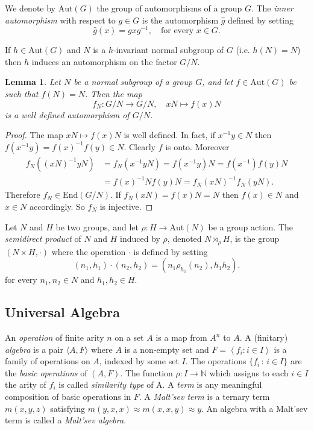 \documentclass[a4paper, english, 9pt]{amsart}
\theoremstyle{plain}
\newtheorem{lemma}[theorem]{Lemma}
\theoremstyle{definition}
\def\aut#1{\mathrm{Aut}(#1)}
\def\End#1{\mathrm{End}(#1)}
\def\comment#1{{\color{red} #1}}
\def\setof#1#2{\{#1\,\colon\,#2\}}
\def\fs#1{{\color{cyan} #1}}
\begin{document}
We denote by $\aut{G}$ the group of automorphisms of a group $G$. The \emph{inner automorphism} with respect to $g\in G$ is the automorphism $\widehat{g}$ defined by setting 
\[
\widehat{g}(x) = gxg^{-1}, \quad \text{for every } x \in G.
\]
 
 If $h\in \aut{G}$ and $N$ is a $h$-invariant normal subgroup of $G$ (i.e. $h(N)=N$) then $h$ induces an automorphism on the factor $G/N$.%

\begin{lemma}
    Let $N$ be a normal subgroup of a group $G$, and let $f\in\aut{G}$ be such that $f(N)=N$. Then the map $$f_N:G/N\longrightarrow G/N,\quad xN \mapsto f(x)N$$ is a well defined automorphism of $G/N$.
\end{lemma}
\begin{proof}
    The map $xN\mapsto f(x)N$ is well defined. In fact, if $x^{-1}y\in N$ then $f(x^{-1}y)=f(x)^{-1}f(y)\in N$. Clearly $f$ is onto. Moreover 
    \begin{align*}
    f_N((xN)^{-1} yN)&=f_N(x^{-1}yN)=f(x^{-1}y)N=f(x^{-1})f(y)N\\&=f(x)^{-1}N f(y)N=f_N(xN)^{-1}f_N(yN).        
    \end{align*}
 Therefore $f_N\in \End{G/N}$. If $f_N(xN)=f(x)N=N$ then $f(x)\in N$ and $x\in N$ accordingly. So $f_N$ is injective.
\end{proof}

Let $N$ and $H$ be two groups, and let $\rho: H \to \aut{N}$ be a group action. The \emph{semidirect product} of $N$ and $H$ induced by $\rho$, denoted $N \rtimes_\rho H$, is the group $(N \times H,\cdot)$ where the operation $\cdot$ is defined by setting
\[
(n_1, h_1) \cdot (n_2, h_2) = (n_1 \rho_{h_1}(n_2), h_1 h_2).
\]
for every $n_1,n_2\in N$ and $h_1,h_2\in H$.



\subsection{Universal Algebra}


An {\it operation} of finite arity $n$ on a set $A$ is a map from $A^n$ to $A$. A (finitary) \emph{algebra} is a pair $\langle A, F\rangle$ where $A$ is a non-empty set and $F=\left\langle f_i: i \in I\right\rangle$ is a family of operations on $A$, indexed by some set $I$. The operations $\setof{f_i}{i\in I}$ are the  {\it basic operations} of $(A,F)$. The function $\rho: I \rightarrow \mathbb{N}$ which assigns to each $i \in I$ the arity of $f_i$ is called \emph{similarity type} of A. %
A {\it term} is any meaningful composition of basic operations in $F$. A {\it Malt'sev term} is a ternary term $m(x,y,z)$ satisfying $m(y,x,x)\approx m(x,x,y)\approx y$. An algebra with a Malt'sev term is called a {\it Malt'sev algebra}.
\end{document}
